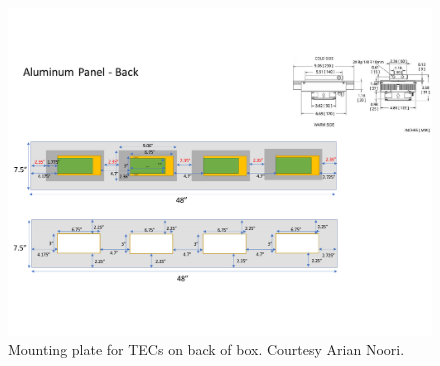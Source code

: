 \begin{figure}
    \centering
    \includegraphics[width=1\textwidth]{Images/network_box_TEC_mount_back.pdf}
    \caption{Mounting plate for TECs on back of box. Courtesy Arian Noori.}
    \label{fig:box_TEC_mount_back}
\end{figure}

\newpage
